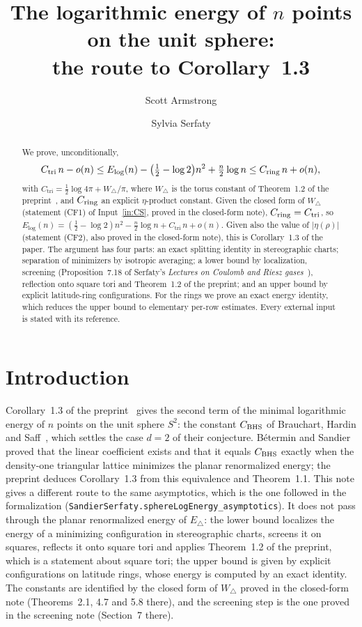\documentclass[11pt]{article}
\title{The logarithmic energy of $n$ points on the unit sphere:\\
\large the route to Corollary~1.3}
\author{Scott Armstrong \and Sylvia Serfaty}
\date{}
\theoremstyle{definition}
\theoremstyle{remark}
\newcommand{\Wtri}{W_{\triangle}}
\newcommand{\lean}[1]{\texttt{#1}}
\begin{document}
\sloppy
\maketitle

\begin{abstract}
We prove, unconditionally,
\[
C_{\mathrm{tri}}\,n-o(n)\le E_{\log}(n)-\bigl(\tfrac12-\log2\bigr)n^2+\tfrac n2\log n\le C_{\rm ring}\,n+o(n),
\]
with $C_{\mathrm{tri}}=\tfrac12\log4\pi+\Wtri/\pi$, where $\Wtri$ is the torus constant of Theorem~1.2 of the
preprint~\cite{Preprint}, and $C_{\rm ring}$ an explicit $\eta$-product constant. Given the closed form of $\Wtri$
(statement (CF1) of Input~\ref{in:CS}, proved in the closed-form note), $C_{\rm ring}=C_{\mathrm{tri}}$, so
$E_{\log}(n)=(\tfrac12-\log2)n^2-\tfrac n2\log n+C_{\mathrm{tri}}\,n+o(n)$. Given also the value of
$|\eta(\rho)|$ (statement (CF2), also proved in the closed-form note), this is Corollary~1.3 of the paper.
The argument has four parts: an exact splitting identity in stereographic charts;
separation of minimizers by isotropic averaging; a lower bound by localization, screening (Proposition~7.18 of
Serfaty's \emph{Lectures on Coulomb and Riesz gases}~\cite{Lectures}), reflection onto square tori and Theorem~1.2 of the
preprint; and an upper bound by explicit
latitude-ring configurations. For the rings we prove an exact energy identity, which reduces the
upper bound to elementary per-row estimates. Every external input is stated with its reference.
\end{abstract}

\section*{Introduction}
Corollary~1.3 of the preprint~\cite{Preprint} gives the second term of the minimal logarithmic energy of $n$ points on the
unit sphere $S^2$: the constant $C_{\rm BHS}$ of Brauchart, Hardin and Saff~\cite{BrauchartHardinSaff2012}, which settles the case
$d=2$ of their conjecture. B\'etermin and Sandier~\cite{BeterminSandier2018} proved that the linear coefficient exists and
that it equals $C_{\rm BHS}$ exactly when the density-one triangular lattice minimizes the planar renormalized energy; the preprint
deduces Corollary~1.3 from this equivalence and Theorem~1.1. This note gives a different route to the same
asymptotics, which is the one followed in the formalization (\lean{SandierSerfaty.sphereLogEnergy\_asymptotics}). It does not pass
through the planar renormalized energy of $E_\triangle$: the lower bound localizes the energy of a minimizing configuration
in stereographic charts, screens it on squares, reflects it onto square tori and applies Theorem~1.2 of the preprint, which
is a statement about square tori; the upper bound is given by explicit configurations on latitude rings, whose energy is computed by an
exact identity. The constants are identified by the closed form of $\Wtri$ proved in the closed-form note
(Theorems~2.1, 4.7 and 5.8 there), and the screening step is the one proved in the screening note (Section~7 there).
\end{document}
